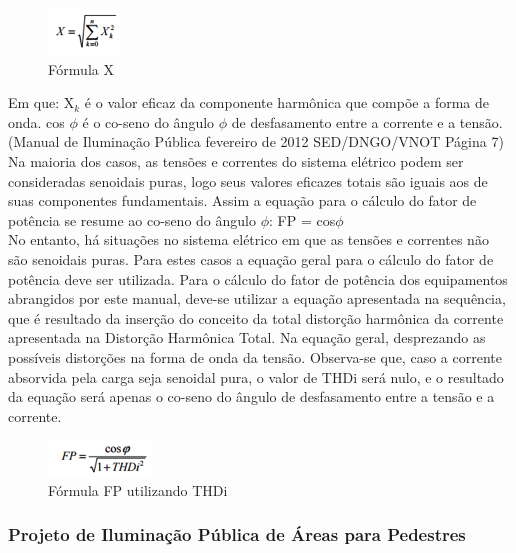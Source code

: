 \begin{figure}[h!]
	 \centering
	\label{FormulaX}
	 \includegraphics[keepaspectratio=true,scale=0.8]{figuras/FormulaX.png}
	 \caption{F\'ormula X}
\end{figure}

Em que: X$_{k}$ \'e o valor eficaz da componente harm\^onica que comp\~oe a forma de onda.
cos $\phi$ \'e o co-seno do \^angulo $\phi$ de desfasamento entre a corrente e a tens\~ao. (Manual de Ilumina\c{c}\~ao P\'ublica fevereiro de 2012 SED/DNGO/VNOT P\'agina 7) \\ Na maioria dos casos, as tens\~oes e correntes do sistema el\'etrico podem ser consideradas senoidais puras, logo seus valores eficazes totais s\~ao iguais aos de suas componentes fundamentais. Assim a equa\c{c}\~ao para o c\'alculo do fator de pot\^encia se resume ao co-seno do \^angulo $\phi$: FP = cos$\phi$ \\ No entanto, h\'a situa\c{c}\~oes no sistema el\'etrico em que as tens\~oes e correntes n\~ao s\~ao senoidais puras. Para estes casos a equa\c{c}\~ao geral para o c\'alculo do fator de pot\^encia deve ser utilizada. Para o c\'alculo do fator de pot\^encia dos equipamentos abrangidos por este manual, deve-se utilizar a equa\c{c}\~ao apresentada na sequ\^encia, que \'e resultado da inser\c{c}\~ao do conceito da total distor\c{c}\~ao harm\^onica da corrente apresentada na Distor\c{c}\~ao Harm\^onica Total. Na equa\c{c}\~ao geral, desprezando as poss\'iveis distor\c{c}\~oes na forma de onda da tens\~ao. Observa-se que, caso a corrente absorvida pela carga seja senoidal pura, o valor de THDi ser\'a nulo, e o resultado da equa\c{c}\~ao ser\'a apenas o co-seno do \^angulo de desfasamento entre a tens\~ao e a corrente.

\begin{figure}[h!]
	 \centering
	\label{FormulaFP2}
	 \includegraphics[keepaspectratio=true,scale=0.8]{figuras/FormulaFP2.png}
	 \caption{F\'ormula FP utilizando THDi}
\end{figure}

\subsubsection{Projeto de Ilumina\c{c}\~ao P\'ublica de \'Areas para Pedestres}

